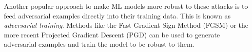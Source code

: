 \documentclass[../main.tex]{subfiles}
\begin{document}
    Another popular approach to make ML models more robust to these attacks is to feed adversarial examples directly into their training data. This is known as \textit{adversarial training}. Methods like the Fast Gradient Sign Method \cite{goodfellowExplainingHarnessingAdversarial2015} (FGSM) or the more recent Projected Gradient Descent (PGD) \autocite{madryDeepLearningModels2019}  can be used to generate adversarial examples and train the model to be robust to them. 



    
\end{document}

